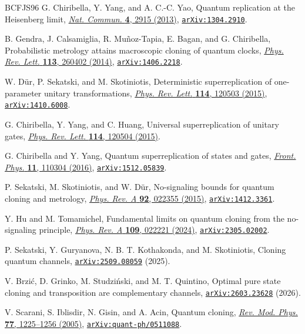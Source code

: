 \documentclass[11pt]{article}
\theoremstyle{remark}
\theoremstyle{plain}
\newcommand{\doi}[2]{\href{https://doi.org/#1}{#2}}
\newcommand{\arxiv}[1]{\href{https://arxiv.org/abs/#1}{\texttt{arXiv:#1}}}
\begin{document}
\begin{thebibliography}{BCFJS96}
G. Chiribella, Y. Yang, and A. C.-C. Yao,
Quantum replication at the Heisenberg limit,
\doi{10.1038/ncomms3915}{\emph{Nat. Commun.} \textbf{4}, 2915 (2013)},
\arxiv{1304.2910}.

B. Gendra, J. Calsamiglia, R. Mu\~noz-Tapia, E. Bagan, and G. Chiribella,
Probabilistic metrology attains macroscopic cloning of quantum clocks,
\doi{10.1103/PhysRevLett.113.260402}{\emph{Phys. Rev. Lett.} \textbf{113}, 260402 (2014)},
\arxiv{1406.2218}.

W. D\"ur, P. Sekatski, and M. Skotiniotis,
Deterministic superreplication of one-parameter unitary transformations,
\doi{10.1103/PhysRevLett.114.120503}{\emph{Phys. Rev. Lett.} \textbf{114}, 120503 (2015)},
\arxiv{1410.6008}.

G. Chiribella, Y. Yang, and C. Huang,
Universal superreplication of unitary gates,
\doi{10.1103/PhysRevLett.114.120504}{\emph{Phys. Rev. Lett.} \textbf{114}, 120504 (2015)}.

G. Chiribella and Y. Yang,
Quantum superreplication of states and gates,
\doi{10.1007/s11467-016-0556-7}{\emph{Front. Phys.} \textbf{11}, 110304 (2016)},
\arxiv{1512.05839}.

P. Sekatski, M. Skotiniotis, and W. D\"ur,
No-signaling bounds for quantum cloning and metrology,
\doi{10.1103/PhysRevA.92.022355}{\emph{Phys. Rev. A} \textbf{92}, 022355 (2015)},
\arxiv{1412.3361}.

Y. Hu and M. Tomamichel,
Fundamental limits on quantum cloning from the no-signaling principle,
\doi{10.1103/PhysRevA.109.022221}{\emph{Phys. Rev. A} \textbf{109}, 022221 (2024)},
\arxiv{2305.02002}.

P. Sekatski, Y. Guryanova, N. B. T. Kothakonda, and M. Skotiniotis,
Cloning quantum channels,
\arxiv{2509.08059} (2025).

V. Brzi\'c, D. Grinko, M. Studzi\'nski, and M. T. Quintino,
Optimal pure state cloning and transposition are complementary channels,
\arxiv{2603.23628} (2026).

V. Scarani, S. Iblisdir, N. Gisin, and A. Acin,
Quantum cloning,
\doi{10.1103/RevModPhys.77.1225}{\emph{Rev. Mod. Phys.} \textbf{77}, 1225--1256 (2005)},
\arxiv{quant-ph/0511088}.


\end{thebibliography}
\end{document}
